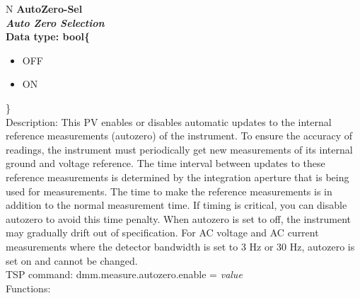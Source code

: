 \documentclass[openany]{article}
\begin{document}
		\begin{tabular}{N}
			\hline
			\bfseries AutoZero-Sel\label{pv:autozero-sel} \\ \hline
			\emph{Auto Zero Selection} \\
			Data type: bool\{\begin{itemize}[noitemsep]
				\small
				\item[] OFF
				\item[] ON
			\end{itemize}\} \\
			Description: This PV enables or disables automatic updates to the internal reference measurements (autozero) of the instrument. To ensure the accuracy of readings, the instrument must periodically get new measurements of its internal ground and voltage reference. The time interval between updates to these reference measurements is determined by the integration aperture that is being used for measurements. The time to make the reference measurements is in addition to the normal measurement time. If timing is critical, you can disable autozero to avoid this time penalty. When autozero is set to off, the instrument may gradually drift out of specification. For AC voltage and AC current measurements where the detector bandwidth is set to 3 Hz or 30 Hz, autozero is set on and cannot be changed. \\
			TSP command: dmm.measure.autozero.enable = \emph{value} \\
			Functions: \\
			\arrayrulecolor{\FuncTableBorderColor}

		\end{tabular}
\end{document}
